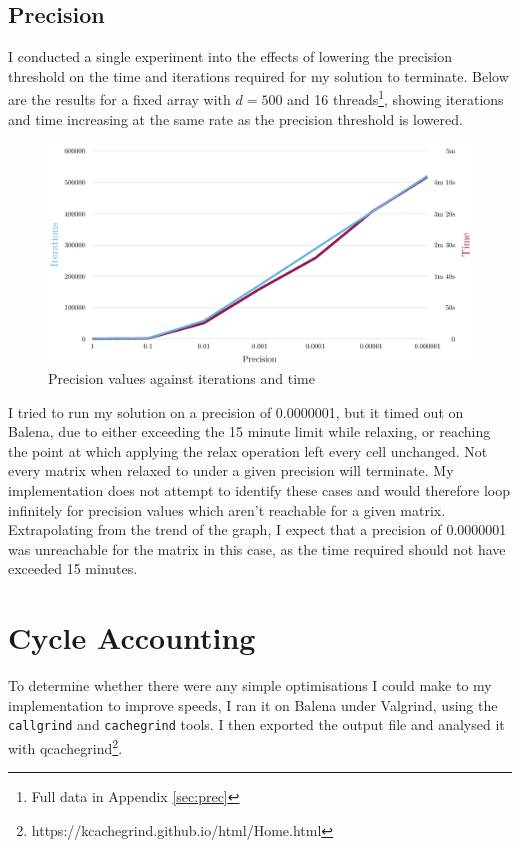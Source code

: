 \documentclass[12pt]{article}
\begin{document}
\subsection{Precision}

I conducted a single experiment into the effects of lowering the precision threshold on the time and iterations required for my solution to terminate. Below are the results for a fixed array with $d=500$ and 16 threads\footnote{Full data in Appendix \ref{sec:prec}}, showing iterations and time increasing at the same rate as the precision threshold is lowered.

\begin{figure}[h!]
	\hspace{-0.8cm}\includegraphics[width=1.1\textwidth]{img/prec-time.pdf}
	\caption{Precision values against iterations and time}
	\label{fig:precision}
\end{figure}


I tried to run my solution on a precision of 0.0000001, but it timed out on Balena, due to either exceeding the 15 minute limit while relaxing, or reaching the point at which applying the relax operation left every cell unchanged. Not every matrix when relaxed to under a given precision will terminate. My implementation does not attempt to identify these cases and would therefore loop infinitely for precision values which aren't reachable for a given matrix. Extrapolating from the trend of the graph, I expect that a precision of 0.0000001 was unreachable for the matrix in this case, as the time required should not have exceeded 15 minutes.


\clearpage
\section{Cycle Accounting}

To determine whether there were any simple optimisations I could make to my implementation to improve speeds, I ran it on Balena under Valgrind, using the \texttt{callgrind} and \texttt{cachegrind} tools. I then exported the output file and analysed it with qcachegrind\footnote{https://kcachegrind.github.io/html/Home.html}.
\end{document}
